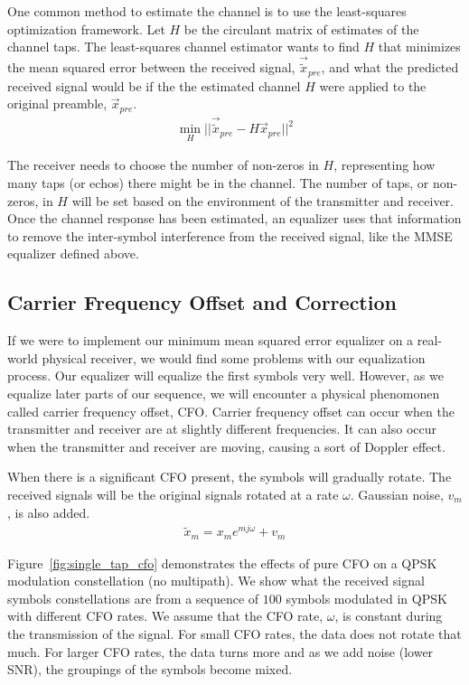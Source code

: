 One common method to estimate the channel is to use the least-squares optimization framework. Let $H$ be the circulant matrix of estimates of the channel taps.  The least-squares channel estimator wants to find $H$ that minimizes the mean squared error between the received signal, $\vec{\tilde{x}}_{pre}$, and what the predicted received signal would be if the the estimated channel $H$ were applied to the original preamble, $\vec{x}_{pre}$.
\begin{align}
\min_H ||\vec{\tilde{x}}_{pre}-H\vec{x}_{pre}||^2
\end{align}

The receiver needs to choose the number of non-zeros in $H$, representing how many taps (or echos) there might be in the channel.  The number of taps, or non-zeros, in $H$ will be set based on the environment of the transmitter and receiver.
Once the channel response has been estimated, an equalizer uses that information to remove the inter-symbol interference from the received signal, like the MMSE equalizer defined above.

 
\subsection{Carrier Frequency Offset and Correction}

If we were to implement our minimum mean squared error equalizer on a real-world physical receiver, we would find some problems with our equalization process.  
Our equalizer will equalize the first symbols very well.  However, as we equalize later parts of our sequence, we will encounter a physical phenomonen called carrier frequency offset, CFO.
Carrier frequency offset can occur when the transmitter and receiver are at slightly different frequencies.  It can also occur when the transmitter and receiver are moving, causing a sort of Doppler effect. 

When there is a significant CFO present, the symbols will gradually rotate. The received signals will be the original signals rotated at a rate $\omega$. Gaussian noise, $v_m$, is also added.
\begin{align}
\tilde{x}_m = x_m e^{mj\omega}+v_m
\end{align} 

Figure~\ref{fig:single_tap_cfo} demonstrates the effects of pure CFO on a QPSK modulation constellation (no multipath). 
We show what the received signal symbols constellations are from a sequence of $100$ symbols modulated in QPSK with different CFO rates.  We assume that the CFO rate, $\omega$, is constant during the transmission of the signal.
For small CFO rates, the data does not rotate that much.  For larger CFO rates, the data turns more and as we add noise (lower SNR), the groupings of the symbols become mixed.

